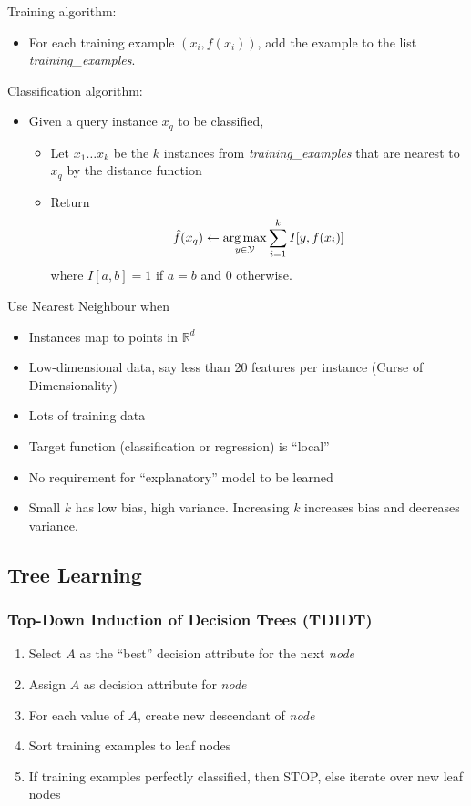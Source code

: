 Training algorithm:
\begin{itemize}
    \item For each training example \((x_i, f(x_i))\), add the example to the list \textit{training\_examples}.
\end{itemize}

Classification algorithm:
\begin{itemize}
    \item Given a query instance \(x_q\) to be classified,
    \begin{itemize}
        \item Let \(x_1 \dots x_k\) be the \(k\) instances from \textit{training\_examples} that are nearest to \(x_q\) by the distance function
        \item Return
        \[\hat{f}(x_q) \leftarrow \operatorname*{arg\,max}_{y \in \mathcal{Y}} \sum_{i = 1}^k I[y, f(x_i)]\]
        where \(I[a, b] = 1\) if \(a = b\) and 0 otherwise.
    \end{itemize}
\end{itemize}

Use Nearest Neighbour when
\begin{itemize}
    \item Instances map to points in \(\mathbb{R}^d\)
    \item Low-dimensional data, say less than 20 features per instance (Curse of Dimensionality)
    \item Lots of training data
    \item Target function (classification or regression) is ``local''
    \item No requirement for ``explanatory'' model to be learned
    \item Small \(k\) has low bias, high variance. Increasing \(k\) increases bias and decreases variance.
\end{itemize}

\subsection{Tree Learning}

\subsubsection{Top-Down Induction of Decision Trees (TDIDT)}

\begin{enumerate}
    \item Select \(A\) as the ``best'' decision attribute for the next \textit{node}
    \item Assign \(A\) as decision attribute for \textit{node}
    \item For each value of \(A\), create new descendant of \textit{node}
    \item Sort training examples to leaf nodes
    \item If training examples perfectly classified, then STOP, else iterate over new leaf nodes
\end{enumerate}

